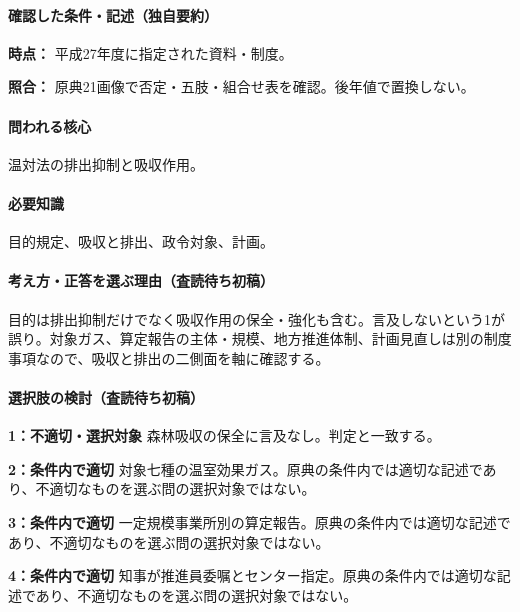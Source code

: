 \paragraph{確認した条件・記述（独自要約）}\mbox{}\par

\noindent\textbf{時点：} 平成27年度に指定された資料・制度。\par

\noindent\textbf{照合：} 原典21画像で否定・五肢・組合せ表を確認。後年値で置換しない。\par

\paragraph{問われる核心} 温対法の排出抑制と吸収作用。

\paragraph{必要知識} 目的規定、吸収と排出、政令対象、計画。

\paragraph{考え方・正答を選ぶ理由（査読待ち初稿）} 目的は排出抑制だけでなく吸収作用の保全・強化も含む。言及しないという1が誤り。対象ガス、算定報告の主体・規模、地方推進体制、計画見直しは別の制度事項なので、吸収と排出の二側面を軸に確認する。

\paragraph{選択肢の検討（査読待ち初稿）}\mbox{}\par

\noindent\textbf{1：不適切・選択対象} 森林吸収の保全に言及なし。判定と一致する。\par

\noindent\textbf{2：条件内で適切} 対象七種の温室効果ガス。原典の条件内では適切な記述であり、不適切なものを選ぶ問の選択対象ではない。\par

\noindent\textbf{3：条件内で適切} 一定規模事業所別の算定報告。原典の条件内では適切な記述であり、不適切なものを選ぶ問の選択対象ではない。\par

\noindent\textbf{4：条件内で適切} 知事が推進員委嘱とセンター指定。原典の条件内では適切な記述であり、不適切なものを選ぶ問の選択対象ではない。\par

